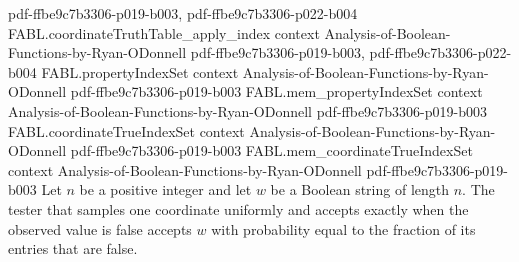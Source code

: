 \begin{theorem}
  {pdf-ffbe9c7b3306-p019-b003,
    pdf-ffbe9c7b3306-p022-b004}
\proofstep
  {FABL.coordinateTruthTable_apply_index}
  {context}
  {Analysis-of-Boolean-Functions-by-Ryan-ODonnell}
  {pdf-ffbe9c7b3306-p019-b003,
    pdf-ffbe9c7b3306-p022-b004}
\proofstep
  {FABL.propertyIndexSet}
  {context}
  {Analysis-of-Boolean-Functions-by-Ryan-ODonnell}
  {pdf-ffbe9c7b3306-p019-b003}
\proofstep
  {FABL.mem_propertyIndexSet}
  {context}
  {Analysis-of-Boolean-Functions-by-Ryan-ODonnell}
  {pdf-ffbe9c7b3306-p019-b003}
\proofstep
  {FABL.coordinateTrueIndexSet}
  {context}
  {Analysis-of-Boolean-Functions-by-Ryan-ODonnell}
  {pdf-ffbe9c7b3306-p019-b003}
\proofstep
  {FABL.mem_coordinateTrueIndexSet}
  {context}
  {Analysis-of-Boolean-Functions-by-Ryan-ODonnell}
  {pdf-ffbe9c7b3306-p019-b003}
Let $n$ be a positive integer and let $w$ be a Boolean string of length $n$. The tester
that samples one coordinate uniformly and accepts exactly when the observed value is
false accepts $w$ with probability equal to the fraction of its entries that are false.
\end{theorem}

